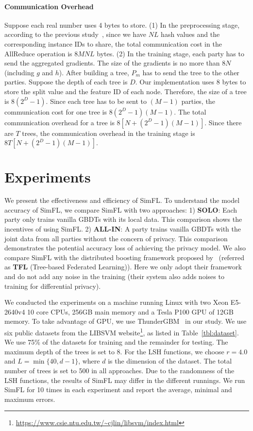 \documentclass[letterpaper]{article} %
\theoremstyle{definition}
\newcommand{\citet}[1]{\citeauthor{#1} \shortcite{#1}}
\begin{document}
\paragraph{Communication Overhead} Suppose each real number uses 4 bytes to store. (1) In the preprocessing stage, according to the previous study~\cite{patarasuk2009bandwidth}, since we have $NL$ hash values and the corresponding instance IDs to share, the total communication cost in the AllReduce operation is $8MNL$ bytes. (2) In the training stage, each party has to send the aggregated gradients. The size of the gradients is no more than $8N$ (including $g$ and $h$). After building a tree, $P_m$ has to send the tree to the other parties. Suppose the depth of each tree is $D$. Our implementation uses 8 bytes to store the split value and the feature ID of each node. Therefore, the size of a tree is $8(2^D-1)$. Since each tree has to be sent to $(M-1)$ parties, the communication cost for one tree is $8(2^D-1)(M-1)$. The total communication overhead for a tree is $8[N +(2^D-1)(M-1)]$. Since there are $T$ trees, the communication overhead in the training stage is $8T[N +(2^D-1)(M-1)]$.

\section{Experiments}
We present the effectiveness and efficiency of SimFL. To understand the model accuracy of SimFL, we compare SimFL with two approaches: 1) {\bf SOLO}: Each party only trains vanilla GBDTs with its local data. This comparison shows the incentives of using SimFL. 2) {\bf ALL-IN}: A party trains vanilla GBDTs with the joint data from all parties without the concern of privacy. This comparison demonstrates the potential accuracy loss of achieving the privacy model. We also compare SimFL with the distributed boosting framework proposed by~\citet{zhao2018inprivate} (referred as {\bf TFL} (Tree-based Federated Learning)). Here we only adopt their framework and do not add any noise in the training (their system also adds noises to training for differential privacy). 

We conducted the experiments on a machine running Linux with two Xeon E5-2640v4 10 core CPUs, 256GB main memory and a Tesla P100 GPU of 12GB memory. To take advantage of GPU, we use ThunderGBM~\cite{ThunderGBM} in our study. We use six public datasets from the LIBSVM website\footnote{\url{https://www.csie.ntu.edu.tw/~cjlin/libsvm/index.html}}, as listed in Table~\ref{tbl:dataset}. We use 75\% of the datasets for training and the remainder for testing. The maximum depth of the trees is set to 8. For the LSH functions, we choose $r = 4.0$ and $L=\min\{40, d-1\}$, where $d$ is the dimension of the dataset. The total number of trees is set to 500 in all approaches. Due to the randomness of the LSH functions, the results of SimFL may differ in the different runnings. We run SimFL for 10 times in each experiment and report the average, minimal and maximum errors.
\end{document}
